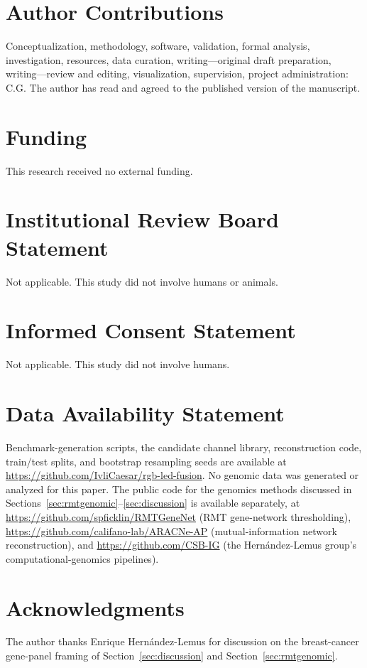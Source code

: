 \documentclass[11pt]{article}
\begin{document}
\section*{Author Contributions}
Conceptualization, methodology, software, validation, formal analysis, investigation, resources, data curation, writing---original draft preparation, writing---review and editing, visualization, supervision, project administration: C.G. The author has read and agreed to the published version of the manuscript.

\section*{Funding}
This research received no external funding.

\section*{Institutional Review Board Statement}
Not applicable. This study did not involve humans or animals.

\section*{Informed Consent Statement}
Not applicable. This study did not involve humans.

\section*{Data Availability Statement}
Benchmark-generation scripts, the candidate channel library, reconstruction code, train/test splits, and bootstrap resampling seeds are available at \url{https://github.com/IvliCaesar/rgb-led-fusion}. No genomic data was generated or analyzed for this paper. The public code for the genomics methods discussed in Sections~\ref{sec:rmtgenomic}--\ref{sec:discussion} is available separately, at \url{https://github.com/spficklin/RMTGeneNet} (RMT gene-network thresholding), \url{https://github.com/califano-lab/ARACNe-AP} (mutual-information network reconstruction), and \url{https://github.com/CSB-IG} (the Hern\'{a}ndez-Lemus group's computational-genomics pipelines).

\section*{Acknowledgments}
The author thanks Enrique Hern\'{a}ndez-Lemus for discussion on the breast-cancer gene-panel framing of Section~\ref{sec:discussion} and Section~\ref{sec:rmtgenomic}.
\end{document}
